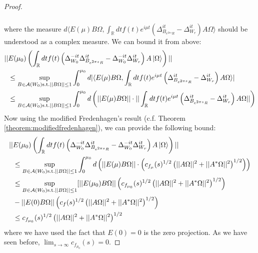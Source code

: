 \documentclass[a4paper,11pt]{article}
\theoremstyle{definition}
\newcommand{\lb}{\left(}
\newcommand{\rb}{\right)}
\begin{document}
\begin{proof}
\begin{align}
\begin{split}
        \end{split}
    \end{align}
    where the measure $d\langle E(\mu)B\Omega, \int_\mathbb{R} dt f(t)e^{i\mu t}\lb\Delta_{B_{e^{2\pi s}R}}^{it} - \Delta_{W_r}^{it}\rb A\Omega\rangle$ should be understood as a complex measure. We can bound it from above:
    \begin{align}
        \begin{split}
            ||&E(\mu_0)\lb\int_\mathbb{R} dt f(t)\lb \Delta_{W_0}^{-it}\Delta_{B_{e^{2\pi s}R}}^{it} - \Delta_{W_0}^{-it}\Delta_{W_r}^{it} \rb A\ket{\Omega}\rb||
            \\&
            \leq\sup_{B\in\mathcal{A}(W_0)\text{s.t.}||B\Omega||\leq 1}\int_0^{\mu_0} d|\langle E(\mu)B\Omega, \int_\mathbb{R} dt f(t)e^{i\mu t}\lb\Delta_{B_{e^{2\pi s}R}}^{it} - \Delta_{W_r}^{it}\rb A\Omega\rangle|
            \\&
            \leq\sup_{B\in\mathcal{A}(W_0)\text{s.t.}||B\Omega||\leq 1}\int_0^{\mu_0}d\lb||E(\mu)B\Omega||\cdot||\int_\mathbb{R} dt f(t)e^{i\mu t}\lb\Delta^{it}_{B_{e^{2\pi s}R}} - \Delta^{it}_{W_r}\rb A\Omega||\rb
        \end{split}
    \end{align}
    Now using the modified Fredenhagen's result (c.f. Theorem \ref{theorem:modifiedfredenhagen}), we can provide the following bound:
    \begin{align}
        \begin{split}
            ||&E(\mu_0)\lb\int_\mathbb{R} dt f(t)\lb \Delta_{W_0}^{-it}\Delta_{B_{e^{2\pi s}R}}^{it} - \Delta_{W_0}^{-it}\Delta_{W_r}^{it} \rb A\ket{\Omega}\rb||
            \\&
            \leq \sup_{B\in\mathcal{A}(W_0)\text{s.t.}||B\Omega||\leq 1}\int_0^{\mu_0}d\lb||E(\mu)B\Omega||\cdot \lb c_{f_\mu}(s)^{1/2}\lb ||A\Omega||^2 + ||A^*\Omega||^2 \rb^{1/2}\rb\rb
            \\&
            \leq\sup_{B\in\mathcal{A}(W_0)\text{s.t.}||B\Omega||\leq 1}[ ||E(\mu_0)B\Omega||\lb c_{f_{\mu_0}}(s)^{1/2}\lb ||A\Omega||^2 + ||A^*\Omega||^2 \rb^{1/2}\rb \\&- ||E(0)B\Omega||\lb c_f(s)^{1/2}\lb||A\Omega||^2 + ||A^*\Omega||^2\rb^{1/2} \rb
            \\&
            \leq c_{f_{\mu_0}}(s)^{1/2}\lb ||A\Omega||^2 + ||A^*\Omega||^2 \rb^{1/2}
        \end{split}
    \end{align}
    where we have used the fact that $E(0) = 0$ is the zero projection. As we have seen before, $\lim_{s\rightarrow\infty}c_{f_{\mu_0}}(s) = 0$.
\end{proof}
\end{document}
